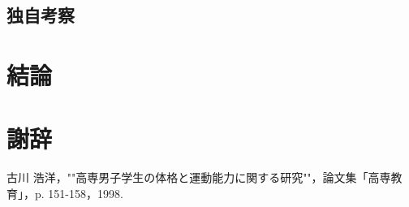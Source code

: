 \documentclass[11pt,dvipdfmx]{jarticle}
\begin{document}
\subsection{独自考察}

\section{結論}

\section{謝辞}


\begin{thebibliography}{99}
 古川 浩洋，""高専男子学生の体格と運動能力に関する研究""，論文集「高専教育」，p. 151-158，1998.
\end{thebibliography}
\end{document}
